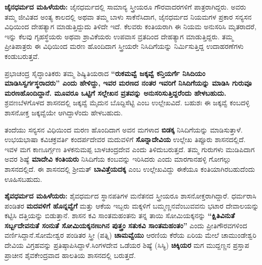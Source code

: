 \textbf{ಜೈನಧರ್ಮದ ಮಹಿಳೆಯರು: } ಜೈನಧರ್ಮದಲ್ಲಿ ಸಾಮಾನ್ಯ ಸ್ತ್ರೀಯರೂ ಗೌರವಾದರಗಳಿಗೆ ಪಾತ್ರರಾಗಿದ್ದರು. ಅವರು ತಮ್ಮ ಜೀವಿತದ ಅಂತ್ಯ ಕಾಲದಲ್ಲಿ ಅಥವಾ ತಮ್ಮ ಬಾಳು ಸಾಕೆನೆಸಿದಾಗ, ಜೈನಧರ್ಮದ ನಿಯಮಗಳ ಪ್ರಕಾರ ಸನ್ಯಸನ ವಿಧಿಯಿಂದ ದೇಹತ್ಯಾಗ ಮಾಡುತ್ತಿದ್ದುದು ತಿಳಿದೇ ಇದೆ. ಕೆಲವರು ಕಂತಿಯರಾಗಿ ಈ ನಿಯಮ ಅನುಸರಿಸಿ ಮೃತರಾದರೆ, ಇನ್ನು ಕೆಲವು ಗೃಹಸ್ಥೆಯರು ಅಥವಾ ಶ್ರಾವಿಕೆಯರು ಉಪವಾಸ ವ್ರತದಿಂದ ದೇಹತ್ಯಾಗ ಮಾಡುತ್ತಿದ್ದರು. ತಮ್ಮ ಪ್ರೀತಿಪಾತ್ರರು ಈ ವಿಧಿಯಿಂದ ಮರಣ ಹೊಂದಿದಾಗ ಸ್ತ್ರೀಯರೇ ನಿಸಿದಿಗೆಯನ್ನು ನಿರ್ಮಿಸುತ್ತಿದ್ದ ಉದಾಹರಣೆಗಳು ಕಂಡುಬರುತ್ತವೆ.

ಪ್ರಭಾಚಂದ್ರ ಸೈದ್ಧಾಂತಿಕರು ತಮ್ಮ ಶಿಷ್ಯಿತಿಯರಾದ \textbf{“ರುಕಮವ್ವೆ ಜಕ್ಕವ್ವೆ ಕನ್ತಿಯರ್ಗೆ ನಿಸಿದಿಯಂ ಮಾಡಿಸಿ\general{\break }ಸ್ವರ್ಗಸ್ಥರಾದರು” ಎಂದು ಹೇಳಿದ್ದು, ಇವರ ಮರಣದ ನಂತರ ಇವರಿಗೆ ನಿಸಿದಿಗೆಯನ್ನು ಮಾಡಿಸಿ ಗುರುವೂ ಮರಣಹೊಂದಿದ್ದಾನೆ. ಮೂವರೂ ಒಟ್ಟಿಗೆ ಸಲ್ಲೇಖನ ವ್ರತವನ್ನು ಅನುಸರಿಸುತ್ತಿದ್ದರೆಂದು ಹೇಳಬಹುದು.} ಶ್ರವಣಬೆಳಗೊಳದ ಶಾಸನದಲ್ಲಿ ಜಕ್ಕವ್ವೆ ಮೈದುನ ಬೊದ್ದಿಸೆಟ್ಟಿ ಎಂಬ ಉಲ್ಲೇಖವಿದೆ. ಬಹುಶಃ ಈ ಜಕ್ಕವ್ವೆ ಕಂಬದಳ್ಳಿ ಶಾಸನೋಕ್ತ ಜಕ್ಕವ್ವೆಯೇ ಆಗಿದ್ದಾಳೆಂದು ಹೇಳಬಹುದು.

ತಂದೆಯು ಸನ್ಯಸನ ವಿಧಿಯಿಂದ ಮರಣ ಹೊಂದಿದಾಗ ಅವನ ಮಗಳಾದ \textbf{ಬಿಡಕ್ಕ} ನಿಸಿದಿಗೆಯನ್ನು ಮಾಡಿಸುತ್ತಾಳೆ. ಉಭಯಭಾಷಾ ಕವಿಚಕ್ರವರ್ತಿ ಕಂದರ್ಪದೇವರ ಮದುವಳಿಗೆ \textbf{ಸೊನ್ನಾದೇವಿಯ} ಉಲ್ಲೇಖ ತಿಪ್ಪೂರು ಶಾಸನದಲ್ಲಿದೆ. ಇವಳ ಮಗ ಕಾಣೂರ್ಗ್ಗಣ ತಿಳಕನುಮಪ್ಪ ಬಾಳಚಂದ್ರದೇವ ಎಂದು ತಿಳಿದುಬರುತ್ತದೆ. ತಮ್ಮ ಗುರುಗಳು ಮುಡಿಪಿದಾಗ ಅವರ ಶಿಷ್ಯೆ \textbf{ಮಾದೇವಿ ಕಂತಿಯರು} ನಿಸಿದಿಗೆಯ ಕಂಬವನ್ನು ಇರಿಸಿದರು ಎಂದು ಮಾರಗಾನಹಳ್ಳಿ ಗೋಗಲ್ಲು ಶಾಸನದಲ್ಲಿದೆ. ಈ ಶಾಸನದಲ್ಲಿ ಶ‍್ರೀಮತ್​ \textbf{ಬಾವಿತ್ತೆಯದಕ್ಕ} ಎಂಬ ಉಲ್ಲೇಖವಿದ್ದು ಈಕೆಯೂ ಕಂತಿಯಾಗಿರಬಹುದೆಂದು ಊಹಿಸಬಹುದು.

\textbf{ಶೈವಧರ್ಮದ ಮಹಿಳೆಯರು: } ಶೈವಧರ್ಮದ ಸ್ಥಾನಪತಿಗಳ ಮನೆತನದ ಸ್ತ್ರೀಯರೂ ಶಾಸನೋಕ್ತರಾಗಿದ್ದಾರೆ. ಧರ್ಮರಾಸಿ ಪಂಡಿತರ \textbf{ಮದವಳಿಗೆ ಹೊನ್ನವ್ವೆಗೆ} ಮತ್ತು ಆಕೆಯ ಇಬ್ಬರು ಮಕ್ಕಳಿಗೆ ಬಮ್ಮಣ್ಣನವೆಂಬುವವನು ಭಟಾರ ದೇವಾಲಯನ್ನು ಕಟ್ಟಿಸಿ ದತ್ತಿಯನ್ನು ಬಿಡುತ್ತಾನೆ. ಶಾಸನ ಕವಿ ಸಾಂತಮಹಂತನು ತನ್ನ ತಾಯಿ ಸೋಮಿಯಕ್ಕನನ್ನು \textbf{“ಕ್ಷಿತಿವಿನುತೆ ಸರ್ಬ್ಬದೇವನುತೆ ಸಂನುತೆ ಸೋಮಿಯಕ್ಕನಣುಗಿನ ಪುತ್ತ್ರಂ ಸತುಕವಿ ಸಾಂತಮಹಂತಂ”} ಎಂದು ಪ್ರೀತಿಗೌರವಗಳಿಂದ ವರ್ಣಿಸಿದ್ದಾನೆ.ಸೋಮೇಶ್ವರ ಪಂಡಿತರ ಸ್ತ್ರೀ (ಪತ್ನಿ) \textbf{ಚಾಮವ್ವೆಯು} ಆರಣಿಯ ಕೆರೆಯ ಏರಿಯ ಮೇಲೆ ಚಾಮುಂಡೇಶ್ವರಿ ದೇವಿಯ ವಿಗ್ರಹವನ್ನು ಪ್ರತಿಷ್ಠಾಪಿಸಿದ್ದಾಳೆ.ಸಿಂಗಳದೇವ ಒಡೆಯರ ಶಿಷ್ಯೆ (ಸಿಸ್ಯಿ) \textbf{ಚಿಕ್ಕಿಯರ} ಮಗ ಮುದ್ದಣ್ಣನ ಪ್ರಸ್ತಾಪ ಪ್ರಾಚೀನ ಶೈವಕೇಂದ್ರವಾದ ಹಾಲತಿಯ ಶಾಸನದಲ್ಲಿ ಬರುತ್ತದೆ.

